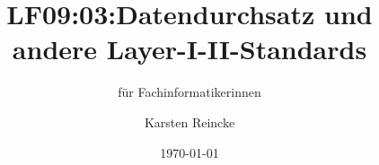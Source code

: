 \documentclass[]{beamer}
\title{LF09:03:Datendurchsatz und andere Layer-I-II-Standards}
\subtitle{für Fachinformatikerinnen}
\institute{GS-LDK}
\author{Karsten Reincke}
\date{\today}
\def\cfgGl{../../../cfg.gl/}
\begin{document}

\begin{frame}
  \titlepage
\end{frame}






\logo{}
\newpage



%
\end{document}
